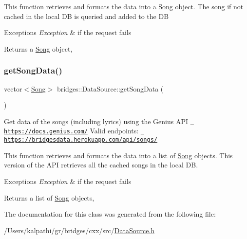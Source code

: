 This function retrieves and formats the data into a \mbox{\hyperlink{classbridges_1_1_song}{Song}} object. The song if not cached in the local DB is queried and added to the DB


\begin{DoxyExceptions}{Exceptions}
{\em Exception} & if the request fails\\
\hline
\end{DoxyExceptions}
\begin{DoxyReturn}{Returns}
a \mbox{\hyperlink{classbridges_1_1_song}{Song}} object, 
\end{DoxyReturn}
\mbox{\label{classbridges_1_1_data_source_a5e8d035a1becf96c71569e0966e93849}} 
\subsubsection{\texorpdfstring{getSongData()}{getSongData()}}
{\footnotesize\ttfamily vector$<$\mbox{\hyperlink{classbridges_1_1_song}{Song}}$>$ bridges\+::\+Data\+Source\+::get\+Song\+Data (\begin{DoxyParamCaption}{ }\end{DoxyParamCaption})\hspace{0.3cm}{\ttfamily [inline]}}

Get data of the songs (including lyrics) using the Genius A\+PI \href{https://docs.genius.com/}{\texttt{ https\+://docs.\+genius.\+com/}} Valid endpoints\+: \href{https://bridgesdata.herokuapp.com/api/songs/}{\texttt{ https\+://bridgesdata.\+herokuapp.\+com/api/songs/}}

This function retrieves and formats the data into a list of \mbox{\hyperlink{classbridges_1_1_song}{Song}} objects. This version of the A\+PI retrieves all the cached songs in the local DB.


\begin{DoxyExceptions}{Exceptions}
{\em Exception} & if the request fails\\
\hline
\end{DoxyExceptions}
\begin{DoxyReturn}{Returns}
a list of \mbox{\hyperlink{classbridges_1_1_song}{Song}} objects, 
\end{DoxyReturn}


The documentation for this class was generated from the following file\+:\begin{DoxyCompactItemize}
\item 
/\+Users/kalpathi/gr/bridges/cxx/src/\mbox{\hyperlink{_data_source_8h}{Data\+Source.\+h}}\end{DoxyCompactItemize}
